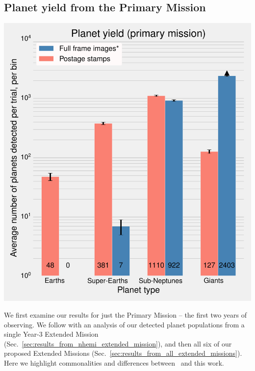\subsection{Planet yield from the Primary Mission}
\label{sec:results_from_primary_missions}
\begin{marginfigure} %
	\centering
	\includegraphics[width=\textwidth]{figures/160729_pm0_shemi_nhemi_nhemi_t20-pri-yield.pdf}
	\caption{Mean numbers of planets detected in \tesss Primary Mission.
	The number of Earths ($R_p < 1.25R_\oplus$), super-Earths ($1.25R_\oplus \le R_p < 2R_\oplus$), sub-Neptunes ($2R_\oplus \le R_p < 4R_\oplus$) and giants agree with the respective values quoted in \protect\citet{Sullivan_2015} to $\lesssim 50\%$. 
	Our full frame images detections in are complete for $R_p < 4R_\oplus$, and incomplete for giant ($R_p > 4R_\oplus$) planets, shown with a lower limit (see text for discussion). 
	Error bars are from only Poisson fluctuations and do not account for systematic uncertainty.}
	\label{fig:primary_planet_yield}
\end{marginfigure}
We first examine our results for just the Primary Mission -- the first two years of \tesss observing. 
We follow with an analysis of our detected planet populations from a single Year-3 Extended Mission (Sec.~\ref{sec:results_from_nhemi_extended_mission}), and then all six of our proposed Extended Missions (Sec.~\ref{sec:results_from_all_extended_missions}).
Here we highlight commonalities and differences between~ and this work.

